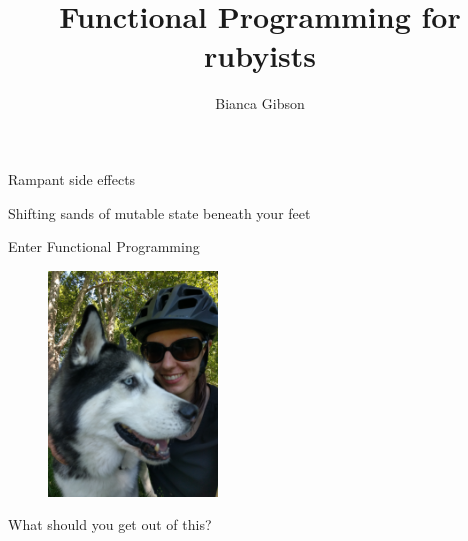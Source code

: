 \documentclass[aspectratio=169]{beamer}
\title{Functional Programming for rubyists}
\author{Bianca Gibson}
\institute{Ruby Conf AU 2016}
\date{}
\begin{document}
\frame{\titlepage}

\begin{frame}
  \begin{center}
    \Huge Rampant side effects
  \end{center}
\end{frame}

\begin{frame}
  \begin{center}
    \Huge Shifting sands of mutable state beneath your feet
  \end{center}
\end{frame}

\begin{frame}
  \begin{center}
    \Huge Enter Functional Programming
  \end{center}
\end{frame}

\begin{frame}
  \begin{figure}[p]
    \includegraphics[width=0.4\textwidth]{./assets/portrait.jpg}
  \end{figure}
\end{frame}

\begin{frame}
  \begin{center}
    \Huge What should you get out of this?
  \end{center}
\end{frame}
\end{document}
